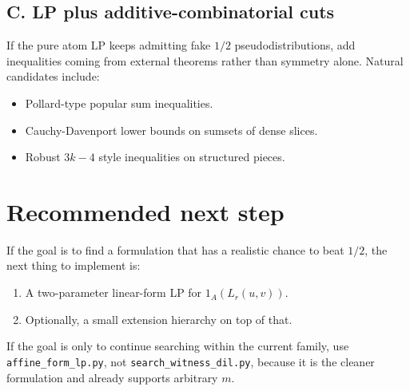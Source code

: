 \documentclass[11pt]{article}
\begin{document}
\subsection*{C. LP plus additive-combinatorial cuts}

If the pure atom LP keeps admitting fake $1/2$ pseudodistributions, add
inequalities coming from external theorems rather than symmetry alone. Natural
candidates include:

\begin{itemize}
\item Pollard-type popular sum inequalities.
\item Cauchy-Davenport lower bounds on sumsets of dense slices.
\item Robust $3k-4$ style inequalities on structured pieces.
\end{itemize}

\section{Recommended next step}

If the goal is to find a formulation that has a realistic chance to beat $1/2$,
the next thing to implement is:

\begin{enumerate}
\item A two-parameter linear-form LP for $1_A(L_r(u,v))$.
\item Optionally, a small extension hierarchy on top of that.
\end{enumerate}

If the goal is only to continue searching within the current family, use
\texttt{affine\_form\_lp.py}, not \texttt{search\_witness\_dil.py}, because it is
the cleaner formulation and already supports arbitrary $m$.
\end{document}
